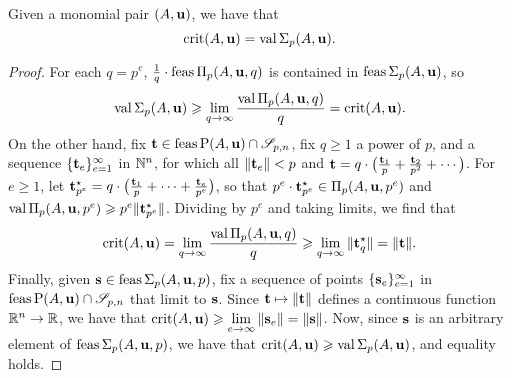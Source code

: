 \documentclass[11pt]{amsart}
\begin{document}

\begin{proposition}
Given a monomial pair $(A, \mathbf{u})$, we have that
\[\operatorname{crit}(A,\mathbf{u}) = \operatorname{val}\Sigma_p(A,\mathbf{u}).\]
\end{proposition}

\begin{proof}
For each $q=p^e$,  $\frac{1}{q}\cdot\operatorname{feas}\Pi_p(A,\mathbf{u}, q)$ is contained in $\operatorname{feas} \Sigma_p(A,\mathbf{u})$, so
\[
\operatorname{val}\Sigma_p(A,\mathbf{u}) \geqslant \displaystyle \lim_{q\to \infty}\frac{\operatorname{val}\Pi_p(A,\mathbf{u}, q)}{q} = \operatorname{crit}(A,\mathbf{u}).
 \]
On the other hand, fix $\mathbf{t} \in \operatorname{feas} \mathrm{P}(A, \mathbf{u}) \cap \mathscr{S}_{p,n}$, fix $q \geq 1$ a power of $p$, and a sequence $\{ \mathbf{t}_e \}_{e=1}^\infty$ in $\mathbb{N}^n$, for which all $\| \mathbf{t}_e \| < p$ and
$\mathbf{t} = q \cdot \big( \frac{\mathbf{t}_1}{p} +\frac{\mathbf{t}_2}{p^2}+\cdots \big)$.  For $e \geq 1$, let
 $\mathbf{t}^\star_{p^e} = q \cdot \big( \frac{\mathbf{t}_1}{p} + \cdots + \frac{\mathbf{t}_e}{p^e}  \big)$, so that $p^e \cdot \mathbf{t}^\star_{p^e} \in \Pi_p(A, \mathbf{u}, p^e)$ and $\operatorname{val} \Pi_p(A, \mathbf{u}, p^e) \geqslant p^e \| \mathbf{t}^\star_{p^e} \|$.
 Dividing by $p^e$ and taking limits, we find that
 \[
\operatorname{crit}(A,\mathbf{u}) = \lim_{q\to \infty} \frac{\operatorname{val} \Pi_p(A, \mathbf{u}, q)}{q} \geqslant \lim_{q \to \infty}   \| \mathbf{t}^\star_q \| = \| \mathbf{t} \|.
 \]
Finally, given $\mathbf{s} \in \operatorname{feas} \Sigma_p(A, \mathbf{u}, p)$, fix a sequence of points $\{ \mathbf{s}_e \}_{e=1}^\infty$ in $\operatorname{feas} \mathrm{P}(A, \mathbf{u}) \cap \mathscr{S}_{p,n}$ that limit to $\mathbf{s}$. Since $\mathbf{t} \mapsto \| \mathbf{t} \|$ defines a continuous function $\mathbb{R}^n \to \mathbb{R}$, we have that $\operatorname{crit}(A, \mathbf{u}) \geqslant \lim \limits_{e \to \infty} \|  \mathbf{s}_e  \| =  \|  \mathbf{s}  \|$.
Now, since $\mathbf{s}$ is an arbitrary element of $\operatorname{feas} \Sigma_p(A, \mathbf{u}, p)$, we have that
$\operatorname{crit}(A, \mathbf{u}) \geqslant \operatorname{val} \Sigma_p(A, \mathbf{u})$, and equality holds.
\end{proof}
\end{document}
